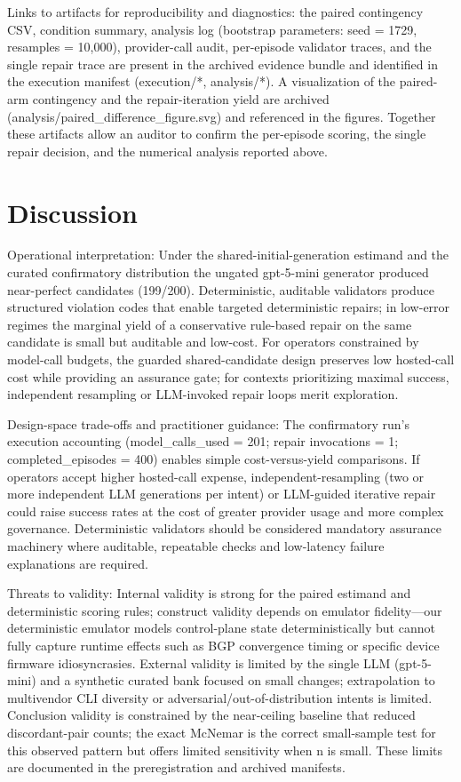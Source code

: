 \documentclass[conference]{IEEEtran}
\begin{document}
Links to artifacts for reproducibility and diagnostics: the paired contingency CSV, condition summary, analysis log (bootstrap parameters: seed = 1729, resamples = 10,000), provider-call audit, per-episode validator traces, and the single repair trace are present in the archived evidence bundle and identified in the execution manifest (execution/*, analysis/*). A visualization of the paired-arm contingency and the repair-iteration yield are archived (analysis/paired\_difference\_figure.svg) and referenced in the figures. Together these artifacts allow an auditor to confirm the per-episode scoring, the single repair decision, and the numerical analysis reported above.

\section{Discussion}
Operational interpretation: Under the shared-initial-generation estimand and the curated confirmatory distribution the ungated gpt-5-mini generator produced near-perfect candidates (199/200). Deterministic, auditable validators produce structured violation codes that enable targeted deterministic repairs; in low-error regimes the marginal yield of a conservative rule-based repair on the same candidate is small but auditable and low-cost. For operators constrained by model-call budgets, the guarded shared-candidate design preserves low hosted-call cost while providing an assurance gate; for contexts prioritizing maximal success, independent resampling or LLM-invoked repair loops merit exploration.

Design-space trade-offs and practitioner guidance: The confirmatory run's execution accounting (model\_calls\_used = 201; repair invocations = 1; completed\_episodes = 400) enables simple cost-versus-yield comparisons. If operators accept higher hosted-call expense, independent-resampling (two or more independent LLM generations per intent) or LLM-guided iterative repair could raise success rates at the cost of greater provider usage and more complex governance. Deterministic validators should be considered mandatory assurance machinery where auditable, repeatable checks and low-latency failure explanations are required.

Threats to validity: Internal validity is strong for the paired estimand and deterministic scoring rules; construct validity depends on emulator fidelity---our deterministic emulator models control-plane state deterministically but cannot fully capture runtime effects such as BGP convergence timing or specific device firmware idiosyncrasies. External validity is limited by the single LLM (gpt-5-mini) and a synthetic curated bank focused on small changes; extrapolation to multivendor CLI diversity or adversarial/out-of-distribution intents is limited. Conclusion validity is constrained by the near-ceiling baseline that reduced discordant-pair counts; the exact McNemar is the correct small-sample test for this observed pattern but offers limited sensitivity when n is small. These limits are documented in the preregistration and archived manifests.
\end{document}
